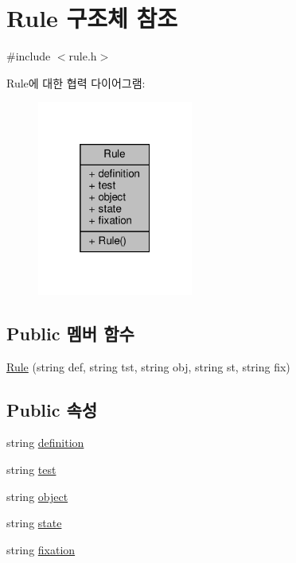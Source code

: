 \hypertarget{struct_rule}{}\section{Rule 구조체 참조}
\label{struct_rule}


{\ttfamily \#include $<$rule.\+h$>$}



Rule에 대한 협력 다이어그램\+:
\nopagebreak
\begin{figure}[H]
\begin{center}
\leavevmode
\includegraphics[width=145pt]{struct_rule__coll__graph}
\end{center}
\end{figure}
\subsection*{Public 멤버 함수}
\begin{DoxyCompactItemize}
\item 
\hyperlink{struct_rule_af2cf72df5006e2ce8c5a05666b028683}{Rule} (string def, string tst, string obj, string st, string fix)
\end{DoxyCompactItemize}
\subsection*{Public 속성}
\begin{DoxyCompactItemize}
\item 
string \hyperlink{struct_rule_a747f1497b7ed37f57b7e005bb01e1b3b}{definition}
\item 
string \hyperlink{struct_rule_a44865cab2ebf41957fd79a0ace31078b}{test}
\item 
string \hyperlink{struct_rule_aef723fe24b9b0acd063cb8cf7ba77ba1}{object}
\item 
string \hyperlink{struct_rule_a565f287f7b2370aca4f019d143227c5f}{state}
\item 
string \hyperlink{struct_rule_a580d700e40dd7c70ab0eea2a75335fb7}{fixation}
\end{DoxyCompactItemize}


